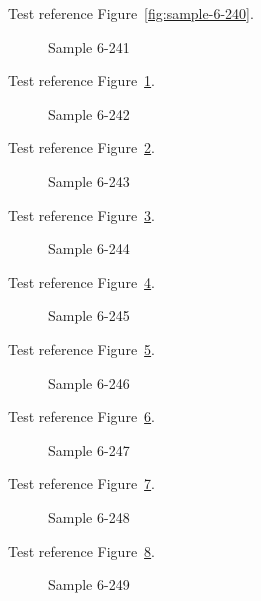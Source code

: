 Test reference Figure~\ref{fig:sample-6-240}.

\begin{figure}[tbhp]
\caption{Sample 6-241}
\label{fig:sample-6-241}
\end{figure}

Test reference Figure~\ref{fig:sample-6-241}.

\begin{figure}[tbhp]
\caption{Sample 6-242}
\label{fig:sample-6-242}
\end{figure}

Test reference Figure~\ref{fig:sample-6-242}.

\begin{figure}[tbhp]
\caption{Sample 6-243}
\label{fig:sample-6-243}
\end{figure}

Test reference Figure~\ref{fig:sample-6-243}.

\begin{figure}[tbhp]
\caption{Sample 6-244}
\label{fig:sample-6-244}
\end{figure}

Test reference Figure~\ref{fig:sample-6-244}.

\begin{figure}[tbhp]
\caption{Sample 6-245}
\label{fig:sample-6-245}
\end{figure}

Test reference Figure~\ref{fig:sample-6-245}.

\begin{figure}[tbhp]
\caption{Sample 6-246}
\label{fig:sample-6-246}
\end{figure}

Test reference Figure~\ref{fig:sample-6-246}.

\begin{figure}[tbhp]
\caption{Sample 6-247}
\label{fig:sample-6-247}
\end{figure}

Test reference Figure~\ref{fig:sample-6-247}.

\begin{figure}[tbhp]
\caption{Sample 6-248}
\label{fig:sample-6-248}
\end{figure}

Test reference Figure~\ref{fig:sample-6-248}.

\begin{figure}[tbhp]
\caption{Sample 6-249}
\label{fig:sample-6-249}
\end{figure}

